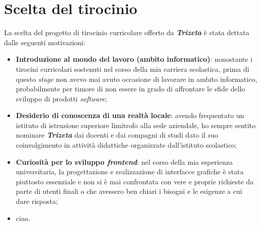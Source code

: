 \section{Scelta del tirocinio}
La scelta del progetto di tirocinio curricolare offerto da \textit{\textbf{Trizeta}} è stata dettata dalle seguenti motivazioni:
\begin{itemize}
    \item \textbf{Introduzione al mondo del lavoro (ambito informatico)}: nonostante i tirocini curricolari sostenuti nel corso della mia carriera scolastica, prima di questo \textit{stage} non avevo mai avuto occasione di lavorare in ambito informatico, 
            probabilmente per timore di non essere in grado di affrontare le sfide dello sviluppo di prodotti \textit{software};
    \item \textbf{Desiderio di conoscenza di una realtà locale}: avendo frequentato un istituto di istruzione superiore limitrofo alla sede aziendale, ho sempre sentito nominare \textit{\textbf{Trizeta}} dai docenti e dai compagni di studi dato il suo 
        coinvolgimento in attività didattiche organizzate dall'istituto scolastico;
    \item \textbf{Curiosità per lo sviluppo \textit{frontend}}: nel corso della mia esperienza universitaria, la progettazione e realizzazione di interfacce grafiche è stata piuttosto essenziale e non si è mai confrontata con vere e proprie
        richieste da parte di utenti finali o  che avessero ben chiari i bisogni e le esigenze a cui dare risposta;
    \item ciao.
\end{itemize}